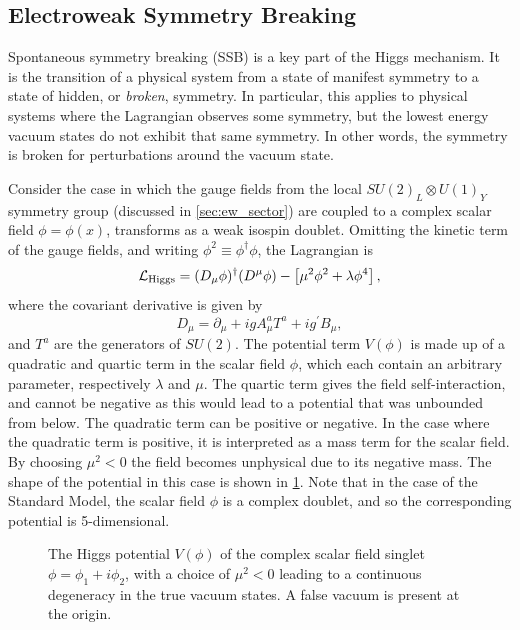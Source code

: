 \subsection{Electroweak Symmetry Breaking}\label{sec:sm_ewsb}

Spontaneous symmetry breaking (SSB) is a key part of the Higgs mechanism. It is the transition of a physical system from a state of manifest symmetry to a state of hidden, or \textit{broken}, symmetry. In particular, this applies to physical systems where the Lagrangian observes some symmetry, but the lowest energy vacuum states do not exhibit that same symmetry. In other words, the symmetry is broken for perturbations around the vacuum state.

Consider the case in which the gauge fields from the local $SU(2)_L \otimes U(1)_Y$ symmetry group (discussed in \cref{sec:ew_sector}) are coupled to a complex scalar field $\phi = \phi(x)$, transforms as a weak isospin doublet.
Omitting the kinetic term of the gauge fields, and writing $\phi^2 \equiv \phi^\dagger \phi$, the Lagrangian is
%
\begin{equation}\label{eq:sm_higgs_lagrangian}
  \mathcal{L}_{\textnormal{Higgs}} = 
  (D_\mu \phi)^\dagger (D^\mu \phi) - \left[ \mu^2 \phi^2 + \lambda \phi^4 \right],
\end{equation}
%
where the covariant derivative is given by
%
\begin{equation}\label{eq:sm_higgs_cov_derivative}
  D_\mu = \partial_\mu + i g A^a_\mu T^a + i g^\prime B_\mu ,
\end{equation}
%
and $T^a$ are the generators of $SU(2)$.
The potential term $V(\phi)$ is made up of a quadratic and quartic term in the scalar field $\phi$, which each contain an arbitrary parameter, respectively $\lambda$ and $\mu$.
The quartic term gives the field self-interaction, and cannot be negative as this would lead to a potential that was unbounded from below.
The quadratic term can be positive or negative.
In the case where the quadratic term is positive, it is interpreted as a mass term for the scalar field.
By choosing $\mu^2 < 0$ the field becomes unphysical due to its negative mass.
The shape of the potential in this case is shown in \cref{fig:higgs_potential}.
Note that in the case of the Standard Model, the scalar field $\phi$ is a complex doublet, and so the corresponding potential is 5-dimensional.
%
\begin{figure}[!htbp]
  \centering
  
  \caption{
    The Higgs potential $V(\phi)$ of the complex scalar field singlet $\phi = \phi_1 + i \phi_2$, with a choice of $\mu^2 < 0$ leading to a continuous degeneracy in the true vacuum states. A false vacuum is present at the origin.
  }
  \label{fig:higgs_potential}
\end{figure}
